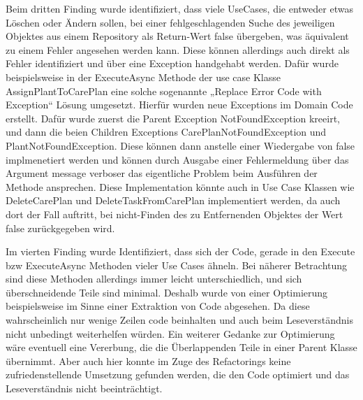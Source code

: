 Beim dritten Finding wurde identifiziert, dass viele UseCases, die entweder etwas Löschen oder Ändern sollen, bei einer fehlgeschlagenden Suche des jeweiligen Objektes aus einem Repository als Return-Wert false übergeben, was äquivalent zu einem Fehler angesehen werden kann.  Diese können allerdings auch direkt als Fehler identifiziert und über eine Exception handgehabt werden. Dafür wurde beispielsweise in der ExecuteAsync Methode der use case Klasse AssignPlantToCarePlan eine solche sogenannte „Replace Error Code with Exception“ Lösung umgesetzt. Hierfür wurden neue Exceptions im Domain Code erstellt. Dafür wurde zuerst die Parent Exception NotFoundException kreeirt, und dann die beien Children Exceptions CarePlanNotFoundException und PlantNotFoundException. Diese können dann anstelle einer Wiedergabe von false implmenetiert werden und können durch Ausgabe einer Fehlermeldung über das Argument message verboser das eigentliche Problem beim Ausführen der Methode ansprechen. Diese Implementation könnte auch in Use Case Klassen wie DeleteCarePlan und DeleteTaskFromCarePlan implementiert werden, da auch dort der Fall auftritt, bei nicht-Finden des zu Entfernenden Objektes der Wert false zurückgegeben wird.

Im vierten Finding wurde Identifiziert, dass sich der Code, gerade in den Execute bzw ExecuteAsync Methoden vieler Use Cases ähneln. Bei näherer Betrachtung sind diese Methoden allerdings immer leicht unterschiedlich, und sich überschneidende Teile sind minimal. Deshalb wurde von einer Optimierung beispielsweise im Sinne einer Extraktion von Code abgesehen. Da diese wahrscheinlich nur wenige Zeilen code beinhalten und auch beim Leseverständnis nicht unbedingt weiterhelfen würden. Ein weiterer Gedanke zur Optimierung wäre eventuell eine Vererbung, die die Überlappenden Teile in einer Parent Klasse übernimmt. Aber auch hier konnte im Zuge des Refactorings keine zufriedenstellende Umsetzung gefunden werden, die den Code optimiert und das Leseverständnis nicht beeinträchtigt.

